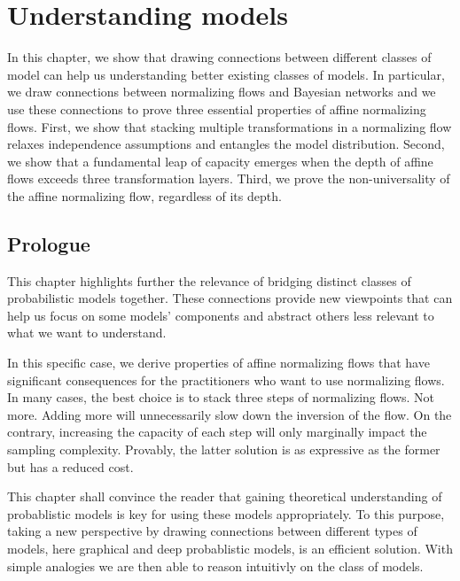 \chapter{Understanding models}\label{ch:04}

\begin{chapter_outline}
  In this chapter, we show that drawing connections between different classes of model can help us understanding better existing classes of models.
  In particular, we draw connections between normalizing flows and Bayesian networks and we use these connections to prove three essential properties of affine normalizing flows.
  First, we show that stacking multiple transformations in a normalizing flow relaxes independence assumptions and entangles the model distribution.
  Second, we show that a fundamental leap of capacity emerges when the depth of affine flows exceeds three transformation layers.
  Third, we prove the non-universality of the affine normalizing flow, regardless of its depth.
\end{chapter_outline}

\section{Prologue}
This chapter highlights further the relevance of bridging distinct classes of probabilistic models together. These connections provide new viewpoints that can help us focus on some models' components and abstract others less relevant to what we want to understand.

In this specific case, we derive properties of affine normalizing flows that have significant consequences for the practitioners who want to use normalizing flows. In many cases, the best choice is to stack three steps of normalizing flows. Not more. Adding more will unnecessarily slow down the inversion of the flow. On the contrary, increasing the capacity of each step will only marginally impact the sampling complexity. Provably, the latter solution is as expressive as the former but has a reduced cost.

This chapter shall convince the reader that gaining theoretical understanding of probablistic models is key for using these models appropriately. To this purpose, taking a new perspective by drawing connections between different types of models, here graphical and deep probablistic models, is an efficient solution. With simple analogies we are then able to reason intuitivly on the class of models.

